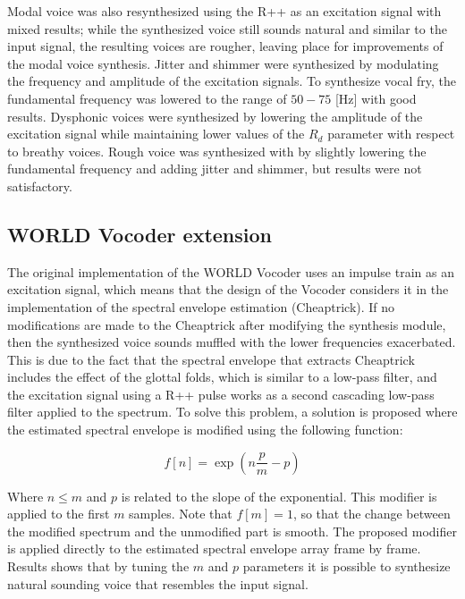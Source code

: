 \documentclass[final,5p,times,twocolumn]{elsarticle}
\begin{document}
Modal voice was also resynthesized using the R++ as an excitation signal with mixed results; while the synthesized voice still sounds natural and similar to the input signal, the resulting voices are rougher, leaving place for improvements of the modal voice synthesis. Jitter and shimmer were synthesized by modulating the frequency and amplitude of the excitation signals. To synthesize vocal fry, the fundamental frequency was lowered to the range of $50-75$ [Hz] with good results. Dysphonic voices were synthesized by lowering the amplitude of the excitation signal while maintaining lower values of the $R_d$ parameter with respect to breathy voices. Rough voice was synthesized with by slightly lowering the fundamental frequency and adding jitter and shimmer, but results were not satisfactory.

\subsection{WORLD Vocoder extension}

The original implementation of the WORLD Vocoder uses an impulse train as an excitation signal, which means that the design of the Vocoder considers it in the implementation of the spectral envelope estimation (Cheaptrick). If no modifications are made to the Cheaptrick after modifying the synthesis module, then the synthesized voice sounds muffled with the lower frequencies exacerbated. This is due to the fact that the spectral envelope that extracts Cheaptrick includes the effect of the glottal folds, which is similar to a low-pass filter, and the excitation signal using a R++ pulse works as a second cascading low-pass filter applied to the spectrum. To solve this problem, a solution is proposed where the estimated spectral envelope is modified using the following function:

\begin{equation}
    \label{eq:exppm}
    f[n] = \exp(n \frac{p}{m} - p)
\end{equation}

Where $n \leq m$ and $p$ is related to the slope of the exponential. This modifier is applied to the first $m$ samples. Note that $f[m] = 1$, so that the change between the modified spectrum and the unmodified part is smooth. The proposed modifier is applied directly to the estimated spectral envelope array frame by frame. Results shows that by tuning the $m$ and $p$ parameters it is possible to synthesize natural sounding voice that resembles the input signal.
\end{document}
